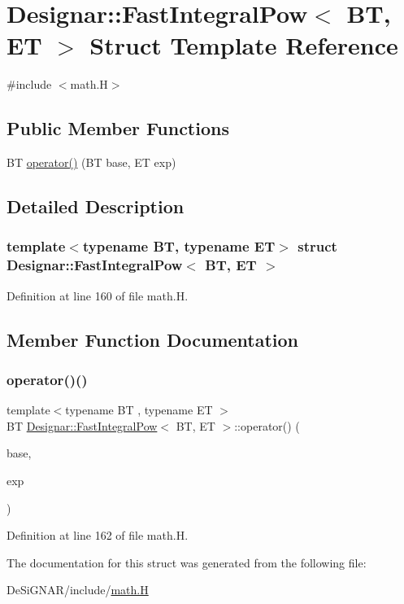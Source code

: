 \hypertarget{struct_designar_1_1_fast_integral_pow}{}\section{Designar\+:\+:Fast\+Integral\+Pow$<$ BT, ET $>$ Struct Template Reference}
\label{struct_designar_1_1_fast_integral_pow}


{\ttfamily \#include $<$math.\+H$>$}

\subsection*{Public Member Functions}
\begin{DoxyCompactItemize}
\item 
BT \hyperlink{struct_designar_1_1_fast_integral_pow_a0c78ecac21d1454b9bdae4620c3473db}{operator()} (BT base, ET exp)
\end{DoxyCompactItemize}


\subsection{Detailed Description}
\subsubsection*{template$<$typename BT, typename ET$>$\newline
struct Designar\+::\+Fast\+Integral\+Pow$<$ B\+T, E\+T $>$}



Definition at line 160 of file math.\+H.



\subsection{Member Function Documentation}
\mbox{\label{struct_designar_1_1_fast_integral_pow_a0c78ecac21d1454b9bdae4620c3473db}} 
\subsubsection{\texorpdfstring{operator()()}{operator()()}}
{\footnotesize\ttfamily template$<$typename BT , typename ET $>$ \\
BT \hyperlink{struct_designar_1_1_fast_integral_pow}{Designar\+::\+Fast\+Integral\+Pow}$<$ BT, ET $>$\+::operator() (\begin{DoxyParamCaption}\item[{BT}]{base,  }\item[{ET}]{exp }\end{DoxyParamCaption})\hspace{0.3cm}{\ttfamily [inline]}}



Definition at line 162 of file math.\+H.



The documentation for this struct was generated from the following file\+:\begin{DoxyCompactItemize}
\item 
De\+Si\+G\+N\+A\+R/include/\hyperlink{math_8_h}{math.\+H}\end{DoxyCompactItemize}

